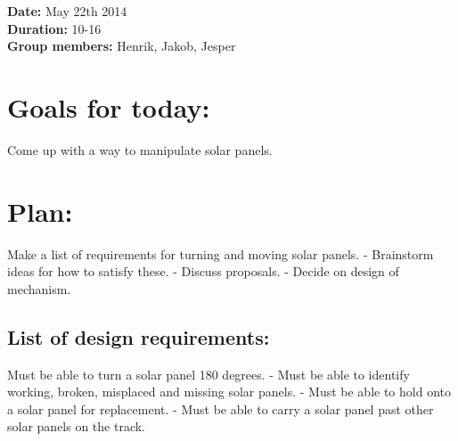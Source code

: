 \textbf{Date:} May 22th 2014\\
\textbf{Duration:} 10-16\\
\textbf{Group members:} Henrik, Jakob, Jesper

\section*{Goals for today:}
Come up with a way to manipulate solar
panels.

\section{Plan:}
Make a list of requirements for turning and moving
solar panels. - Brainstorm ideas for how to satisfy these. - Discuss
proposals. - Decide on design of mechanism.

\subsection{List of design requirements:}
Must be able to turn a solar
panel 180 degrees. - Must be able to identify working, broken, misplaced
and missing solar panels. - Must be able to hold onto a solar panel for
replacement. - Must be able to carry a solar panel past other solar
panels on the track.

